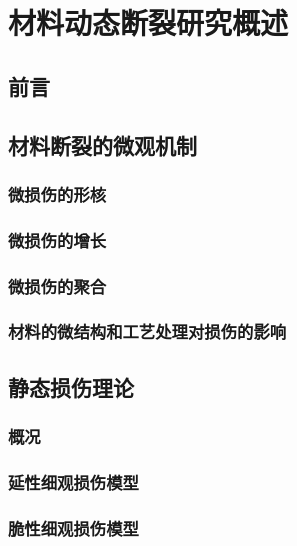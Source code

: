 \documentclass[degree=postdoc]{thuthesis}
\begin{document}
\OMIT


\mainmatter

\clearpage
\setcounter{page}{1}
\chapter{材料动态断裂研究概述}

\clearpage
\setcounter{page}{3}
\section{前言}

\clearpage
\setcounter{page}{7}
\section{材料断裂的微观机制}
\subsection{微损伤的形核}

\clearpage
\setcounter{page}{12}
\subsection{微损伤的增长}

\clearpage
\setcounter{page}{13}
\subsection{微损伤的聚合}

\clearpage
\setcounter{page}{14}
\subsection{材料的微结构和工艺处理对损伤的影响}
\section{静态损伤理论}
\subsection{概况}

\clearpage
\setcounter{page}{17}
\subsection{延性细观损伤模型}

\clearpage
\setcounter{page}{20}
\subsection{脆性细观损伤模型}
\end{document}
